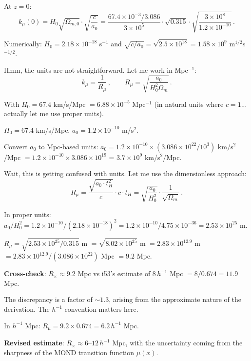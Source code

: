 \documentclass[11pt,a4paper]{article}
\begin{document}
At $z = 0$:
\begin{equation}
k_\mu(0) = H_0\sqrt{\Omega_{m,0}} \cdot \sqrt{\frac{c}{a_0}} = \frac{67.4 \times 10^{-3}/3.086}{3 \times 10^5} \cdot \sqrt{0.315} \cdot \sqrt{\frac{3 \times 10^8}{1.2 \times 10^{-10}}}\,.
\end{equation}

Numerically: $H_0 = 2.18 \times 10^{-18}$ s$^{-1}$ and $\sqrt{c/a_0} = \sqrt{2.5 \times 10^{18}} = 1.58 \times 10^9$ m$^{1/2}$s$^{-1/2}$.

Hmm, the units are not straightforward. Let me work in Mpc$^{-1}$:
\begin{equation}
k_\mu = \frac{1}{R_\mu}\,,\qquad R_\mu = \sqrt{\frac{a_0}{H_0^2\Omega_m}}\,.
\end{equation}

With $H_0 = 67.4$ km/s/Mpc $= 6.88 \times 10^{-5}$ Mpc$^{-1}$ (in natural units where $c = 1$... actually let me use proper units).

$H_0 = 67.4$ km/s/Mpc. $a_0 = 1.2 \times 10^{-10}$ m/s$^2$.

Convert $a_0$ to Mpc-based units: $a_0 = 1.2 \times 10^{-10} \times (3.086 \times 10^{22}/10^3)$ km/s$^2$/Mpc $= 1.2 \times 10^{-10} \times 3.086 \times 10^{19}$ = $3.7 \times 10^{9}$ km/s$^2$/Mpc.

Wait, this is getting confused with units. Let me use the dimensionless approach:
\begin{equation}
R_\mu = \frac{\sqrt{a_0 \cdot t_H^2}}{c} \cdot c \cdot t_H = \sqrt{\frac{a_0}{H_0^2}} \cdot \frac{1}{\sqrt{\Omega_m}}\,.
\end{equation}

In proper units: $a_0/H_0^2 = 1.2 \times 10^{-10}/(2.18 \times 10^{-18})^2 = 1.2 \times 10^{-10}/4.75 \times 10^{-36} = 2.53 \times 10^{25}$ m.

$R_\mu = \sqrt{2.53 \times 10^{25}/0.315}$ m $= \sqrt{8.02 \times 10^{25}}$ m $= 2.83 \times 10^{12.9}$ m $= 2.83 \times 10^{12.9}/(3.086 \times 10^{22})$ Mpc $= 9.2$ Mpc.

\textbf{Cross-check}: $R_\times \approx 9.2$ Mpc vs i53's estimate of $8\,h^{-1}$ Mpc $= 8/0.674 = 11.9$ Mpc.

The discrepancy is a factor of $\sim 1.3$, arising from the approximate nature of the derivation. The $h^{-1}$ convention matters here.

In $h^{-1}$ Mpc: $R_\mu = 9.2 \times 0.674 = 6.2\,h^{-1}$ Mpc.

\textbf{Revised estimate}: $R_\times \approx 6$--$12\,h^{-1}$ Mpc, with the uncertainty coming from the sharpness of the MOND transition function $\mu(x)$.
\end{document}
